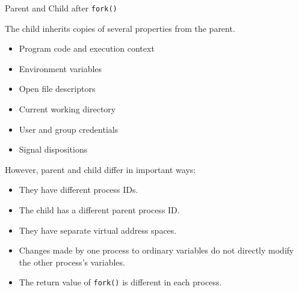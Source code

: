 \documentclass[aspectratio=169]{beamer}
\begin{document}
\begin{frame}{Parent and Child after \texttt{fork()}}

The child inherits copies of several properties from the parent.

\begin{itemize}
    \item Program code and execution context
    \item Environment variables
    \item Open file descriptors
    \item Current working directory
    \item User and group credentials
    \item Signal dispositions
\end{itemize}

However, parent and child differ in important ways:

\begin{itemize}
    \item They have different process IDs.
    \item The child has a different parent process ID.
    \item They have separate virtual address spaces.
    \item Changes made by one process to ordinary variables do not directly
    modify the other process's variables.
    \item The return value of \texttt{fork()} is different in each process.
\end{itemize}

\end{frame}
\end{document}
